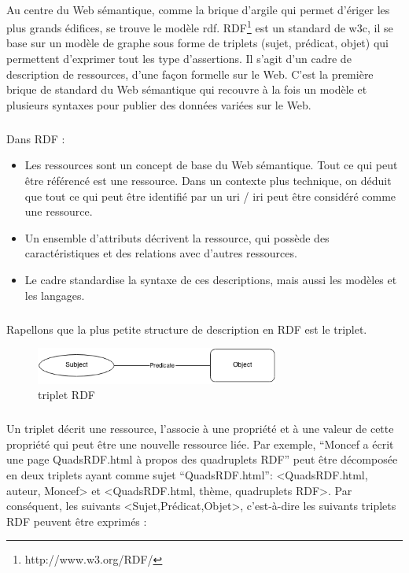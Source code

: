 \documentclass[12pt,a4]{report}
\begin{document}
\paragraph{}
Au centre du Web sémantique, comme la brique d’argile qui permet d’ériger les plus grands édifices, se trouve le modèle \gls{rdf}. RDF\footnote{http://www.w3.org/RDF/} est un standard de \gls{w3c}, il se base sur un modèle de graphe sous forme de triplets (sujet, prédicat, objet) qui permettent d'exprimer tout les type d'assertions. Il s’agit d’un cadre de description de ressources, d’une façon formelle sur le Web.
C’est la première brique de standard du Web sémantique qui recouvre à la fois un modèle et plusieurs syntaxes pour publier des données variées sur le Web.
\subparagraph{}
Dans RDF :
\newline
\begin{itemize}
\item Les ressources sont un concept de base du Web sémantique. Tout ce qui peut être référencé est une ressource. Dans un contexte plus technique, on déduit que tout ce qui peut être identifié par un \gls{uri} / \gls{iri} peut être considéré comme une ressource.
\item Un ensemble d’attributs décrivent la ressource, qui possède des caractéristiques et des relations avec d’autres ressources.
\item Le cadre standardise la syntaxe de ces descriptions, mais aussi les modèles et les langages.
\end{itemize}
\subparagraph{}
Rapellons que la plus petite structure de description en RDF est le triplet.
\begin{figure}[H]
\centering
\centering
\includegraphics[width=8cm]{tripletrdf.png}
\caption{triplet RDF}

\end{figure}
\subparagraph{}
Un triplet décrit une ressource, l’associe à une propriété et à une valeur de cette propriété qui peut être une nouvelle ressource liée. 
\newline
Par exemple, “Moncef a écrit une page QuadsRDF.html à propos des quadruplets RDF” peut être décomposée en deux triplets ayant comme sujet “QuadsRDF.html”: <QuadsRDF.html, auteur, Moncef> et <QuadsRDF.html, thème, quadruplets RDF>.
\newline
Par conséquent, les suivants <Sujet,Prédicat,Objet>, c'est-à-dire les suivants triplets RDF peuvent être exprimés :
\end{document}
